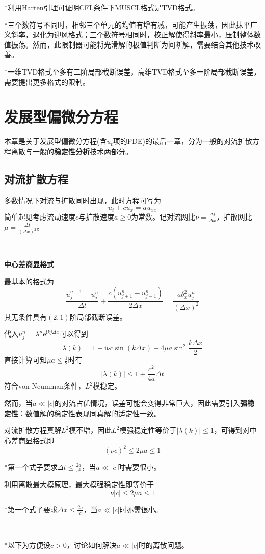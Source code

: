 \documentclass[a4paper,UTF8,fontset=windows]{ctexart}
\begin{document}
*利用Harten引理可证明CFL条件下MUSCL格式是TVD格式。

*三个数符号不同时，相邻三个单元的均值有增有减，可能产生振荡，因此抹平广义斜率，退化为迎风格式；三个数符号相同时，校正解使得斜率最小，压制整体数值振荡。然而，此限制器可能将光滑解的极值判断为间断解，需要结合其他技术改善。

*一维TVD格式至多有二阶局部截断误差，高维TVD格式至多一阶局部截断误差，需要提出更多格式的限制。

\section{发展型偏微分方程}
本章是关于发展型偏微分方程(含$u_t$项的PDE)的最后一章，分为一般的对流扩散方程离散与一般的\textbf{稳定性分析}技术两部分。

\subsection{对流扩散方程}
多数情况下对流与扩散同时出现，此时方程可写为
$$u_t+cu_x=au_{xx}$$
简单起见考虑流动速度$c$与扩散速度$a\ge0$为常数。记对流网比$\nu=\frac{\Delta t}{\Delta x}$，扩散网比$\mu=\frac{\Delta t}{(\Delta x)^2}$。

\

\textbf{中心差商显格式}

最基本的格式为
$$\frac{u_j^{n+1}-u_j^n}{\Delta t}+\frac{c(u_{j+1}^n-u_{j-1}^n)}{2\Delta x}=\frac{a\delta_x^2u_j^n}{(\Delta x)^2}$$
其无条件具有$(2,1)$阶局部截断误差。

代入$u_j^n=\lambda^n\mathrm{e}^{\mathrm{i}kj\Delta x}$可以得到
$$\lambda(k)=1-\mathrm{i}\nu c\sin(k\Delta x)-4\mu a\sin^2\frac{k\Delta x}{2}$$
直接计算可知$\mu a\le\frac{1}{2}$时有
$$|\lambda(k)|\le1+\frac{c^2}{4a}\Delta t$$
符合von Neumman条件，$L^2$模稳定。

然而，当$a\ll|c|$的对流占优情况，误差可能会变得非常巨大，因此需要引入\textbf{强稳定性}：数值解的稳定性表现同真解的适定性一致。

对流扩散方程真解$L^2$模不增，因此$L^2$模强稳定性等价于$|\lambda(k)|\le1$，可得到对中心差商显格式即
$$(\nu c)^2\le 2\mu a\le1$$

*第一个式子要求$\Delta t\le\frac{2a}{c^2}$，当$a\ll|c|$时需要很小。

利用离散最大模原理，最大模强稳定性即等价于
$$\nu|c|\le2\mu a\le1$$

*第一个式子要求$\Delta x\le\frac{2a}{|c|}$，当$a\ll|c|$时亦需很小。

\

*以下为方便设$c>0$，讨论如何解决$a\ll|c|$时的离散问题。
\end{document}
